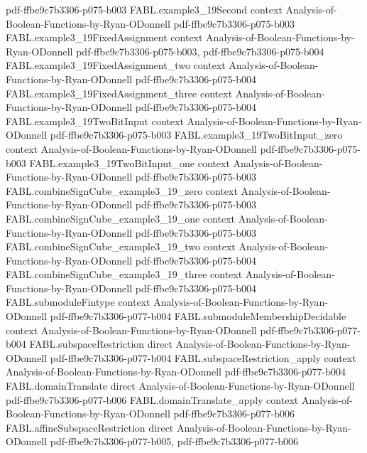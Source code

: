 \begin{theorem}
  {pdf-ffbe9c7b3306-p075-b003}
\proofstep
  {FABL.example3_19Second}
  {context}
  {Analysis-of-Boolean-Functions-by-Ryan-ODonnell}
  {pdf-ffbe9c7b3306-p075-b003}
\proofstep
  {FABL.example3_19FixedAssignment}
  {context}
  {Analysis-of-Boolean-Functions-by-Ryan-ODonnell}
  {pdf-ffbe9c7b3306-p075-b003,
    pdf-ffbe9c7b3306-p075-b004}
\proofstep
  {FABL.example3_19FixedAssignment_two}
  {context}
  {Analysis-of-Boolean-Functions-by-Ryan-ODonnell}
  {pdf-ffbe9c7b3306-p075-b004}
\proofstep
  {FABL.example3_19FixedAssignment_three}
  {context}
  {Analysis-of-Boolean-Functions-by-Ryan-ODonnell}
  {pdf-ffbe9c7b3306-p075-b004}
\proofstep
  {FABL.example3_19TwoBitInput}
  {context}
  {Analysis-of-Boolean-Functions-by-Ryan-ODonnell}
  {pdf-ffbe9c7b3306-p075-b003}
\proofstep
  {FABL.example3_19TwoBitInput_zero}
  {context}
  {Analysis-of-Boolean-Functions-by-Ryan-ODonnell}
  {pdf-ffbe9c7b3306-p075-b003}
\proofstep
  {FABL.example3_19TwoBitInput_one}
  {context}
  {Analysis-of-Boolean-Functions-by-Ryan-ODonnell}
  {pdf-ffbe9c7b3306-p075-b003}
\proofstep
  {FABL.combineSignCube_example3_19_zero}
  {context}
  {Analysis-of-Boolean-Functions-by-Ryan-ODonnell}
  {pdf-ffbe9c7b3306-p075-b003}
\proofstep
  {FABL.combineSignCube_example3_19_one}
  {context}
  {Analysis-of-Boolean-Functions-by-Ryan-ODonnell}
  {pdf-ffbe9c7b3306-p075-b003}
\proofstep
  {FABL.combineSignCube_example3_19_two}
  {context}
  {Analysis-of-Boolean-Functions-by-Ryan-ODonnell}
  {pdf-ffbe9c7b3306-p075-b004}
\proofstep
  {FABL.combineSignCube_example3_19_three}
  {context}
  {Analysis-of-Boolean-Functions-by-Ryan-ODonnell}
  {pdf-ffbe9c7b3306-p075-b004}
\proofstep
  {FABL.submoduleFintype}
  {context}
  {Analysis-of-Boolean-Functions-by-Ryan-ODonnell}
  {pdf-ffbe9c7b3306-p077-b004}
\proofstep
  {FABL.submoduleMembershipDecidable}
  {context}
  {Analysis-of-Boolean-Functions-by-Ryan-ODonnell}
  {pdf-ffbe9c7b3306-p077-b004}
\proofstep
  {FABL.subspaceRestriction}
  {direct}
  {Analysis-of-Boolean-Functions-by-Ryan-ODonnell}
  {pdf-ffbe9c7b3306-p077-b004}
\proofstep
  {FABL.subspaceRestriction_apply}
  {context}
  {Analysis-of-Boolean-Functions-by-Ryan-ODonnell}
  {pdf-ffbe9c7b3306-p077-b004}
\proofstep
  {FABL.domainTranslate}
  {direct}
  {Analysis-of-Boolean-Functions-by-Ryan-ODonnell}
  {pdf-ffbe9c7b3306-p077-b006}
\proofstep
  {FABL.domainTranslate_apply}
  {context}
  {Analysis-of-Boolean-Functions-by-Ryan-ODonnell}
  {pdf-ffbe9c7b3306-p077-b006}
\proofstep
  {FABL.affineSubspaceRestriction}
  {direct}
  {Analysis-of-Boolean-Functions-by-Ryan-ODonnell}
  {pdf-ffbe9c7b3306-p077-b005,
    pdf-ffbe9c7b3306-p077-b006}

\end{theorem}
